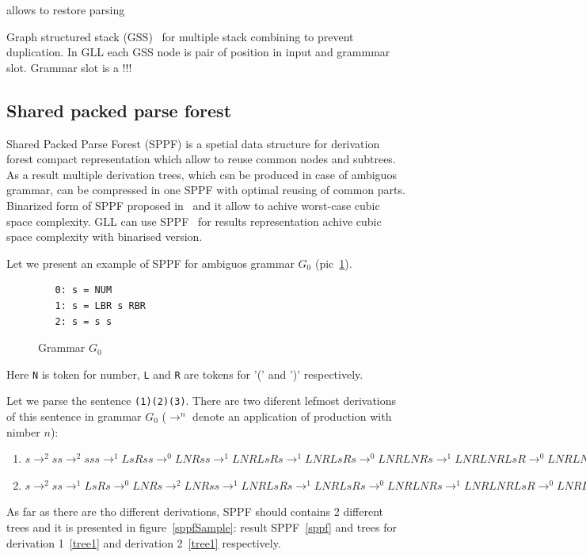 \documentclass{sig-alternate} %
\begin{document}
allows to restore parsing

Graph structured stack (GSS)~\cite{Tomita} for multiple stack combining to prevent duplication.
In GLL each GSS node is pair of position in input and grammmar slot. Grammar slot is a !!! 

\subsection{Shared packed parse forest}

Shared Packed Parse Forest (SPPF) is a spetial data structure for derivation forest compact representation which allow to reuse common nodes and subtrees.
As a result multiple derivation trees, which csn be produced in case of ambiguos grammar, can be compressed in one SPPF with optimal reusing of common parts.  
Binarized form of SPPF proposed in~\cite{brnglr} and it allow to achive worst-case cubic space complexity.
GLL can use SPPF~\cite{gllParsingTree} for results representation achive cubic space complexity with binarised version.

Let we present an example of SPPF for ambiguos grammar $G_0$ (pic~\ref{grammarG0}).

\begin{figure}[h]
   \begin{center}
\begin{verbatim}
   0: s = NUM
   1: s = LBR s RBR
   2: s = s s
\end{verbatim}
   \caption{Grammar $G_0$}
   \label{grammarG0}        
   \end{center}
\end{figure}

Here \verb|N| is token for number, \verb|L| and \verb|R| are tokens for '(' and ')'  respectively.

Let we parse the sentence \verb|(1)(2)(3)|. 
There are two diferent lefmost derivations of this sentence in grammar $G_0$ ($\rightarrow ^ n$ denote an application of production with nimber $n$): 
\begin{enumerate} 
    \item $s \rightarrow ^ 2 s s \rightarrow ^ 2 s s s \rightarrow ^ 1 L s R s s \rightarrow ^ 0 L N R s s \rightarrow ^ 1 
    L N R L s R s \rightarrow ^ 1 L N R L s R s \rightarrow ^ 0 L N R L N R s \rightarrow ^ 1 L N R L N R L s R \rightarrow ^ 0 L N R L N R L N R$
    \item $s \rightarrow ^ 2 s s \rightarrow ^ 1 L s R s  \rightarrow ^ 0 L N R s \rightarrow ^ 2 L N R s s  \rightarrow ^ 1 
    L N R L s R s \rightarrow ^ 1 L N R L s R s \rightarrow ^ 0 L N R L N R s \rightarrow ^ 1 L N R L N R L s R \rightarrow ^ 0 L N R L N R L N R$
\end{enumerate}
    As far as there are tho different derivations, SPPF should contains 2 different trees and it is presented in figure~\ref{sppfSample}: result SPPF~\ref{sppf} and trees for derivation 1~\ref{tree1} and derivation 2~\ref{tree1} respectively. 
\end{document}

